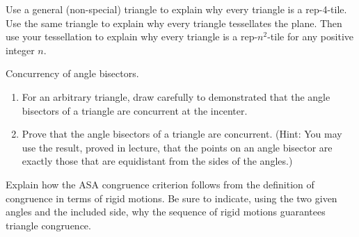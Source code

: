 

\begin{prob}
Use a general (non-special) triangle to explain why every triangle is a rep-4-tile.  
Use the same triangle to explain why every triangle tessellates the plane.  Then use your tessellation to explain why every triangle is a rep-$n^2$-tile for any positive integer $n$. 
\end{prob}

\begin{prob} 
Concurrency of angle bisectors. 
\begin{enumerate}
\item For an arbitrary triangle, draw carefully to demonstrated that the angle bisectors of a triangle are concurrent at the incenter.   
\item Prove that the angle bisectors of a triangle are concurrent.  (Hint:  You may use the result, proved in lecture, that the points on an angle bisector are exactly those that are equidistant from the sides of the angles.)  
\end{enumerate}
\end{prob} 

\begin{prob}
Explain how the ASA congruence criterion follows from the definition of congruence in terms of rigid motions. Be sure to indicate, using the two given angles and the included side, why the sequence of rigid motions guarantees triangle congruence.
\end{prob}


